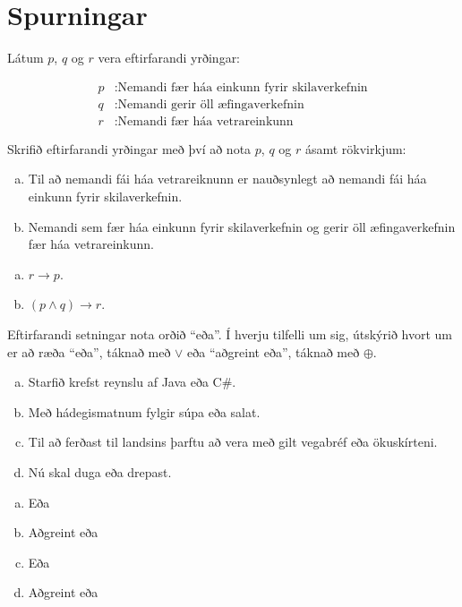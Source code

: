 \documentclass{exam}
\begin{document}
\section{Spurningar}
\begin{questions}
\question Látum $p$, $q$ og $r$ vera eftirfarandi yrðingar:

\begin{align*}
p &: \text{Nemandi fær háa einkunn fyrir skilaverkefnin}\\
q &: \text{Nemandi gerir öll æfingaverkefnin}\\
r &: \text{Nemandi fær háa vetrareinkunn}
\end{align*}

Skrifið eftirfarandi yrðingar með því að nota $p$, $q$ og $r$ ásamt rökvirkjum:

\begin{enumerate}[a)]
 \item Til að nemandi fái háa vetrareiknunn er nauðsynlegt að nemandi fái háa einkunn fyrir skilaverkefnin.
 \item Nemandi sem fær háa einkunn fyrir skilaverkefnin og gerir öll æfingaverkefnin fær háa vetrareinkunn.
\end{enumerate}

\begin{solution}
\begin{enumerate}[a)]
 \item $r \rightarrow p$.\\
 \item $(p \land q) \rightarrow r$.
\end{enumerate}
\end{solution}


\question Eftirfarandi setningar nota orðið ``eða''. Í hverju tilfelli um sig, útskýrið hvort um er að ræða ``eða'', táknað með $\lor$ eða ``aðgreint eða'', táknað með $\oplus$.

\begin{enumerate}[a)]
 \item Starfið krefst reynslu af Java eða C\#.
 \item Með hádegismatnum fylgir súpa eða salat.
 \item Til að ferðast til landsins þarftu að vera með gilt vegabréf eða ökuskírteni.
 \item Nú skal duga eða drepast.
\end{enumerate}

\begin{solution}

\begin{enumerate}[a)]
 \item Eða
 \item Aðgreint eða
 \item Eða
 \item Aðgreint eða
\end{enumerate}


\end{solution}
\end{questions}
\end{document}
